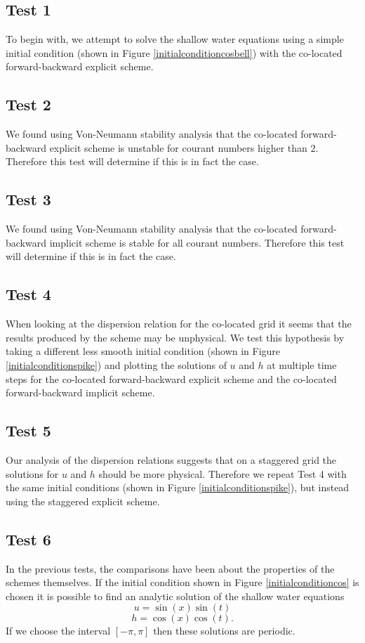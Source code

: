 \documentclass[a4paper,12pt, notitlepage]{article}
\begin{document}
\subsection{Test 1}
To begin with, we attempt to solve the shallow water equations using a simple initial condition (shown in Figure \ref{initialconditioncosbell}) with the co-located forward-backward explicit scheme.

\subsection{Test 2}
We found using Von-Neumann stability analysis that the co-located forward-backward explicit scheme is unstable for courant numbers higher than 2. Therefore this test will determine if this is in fact the case.

\subsection{Test 3}
We found using Von-Neumann stability analysis that the co-located forward-backward implicit scheme is stable for all courant numbers. Therefore this test will determine if this is in fact the case.

\subsection{Test 4}
When looking at the dispersion relation for the co-located grid it seems that the results produced by the scheme may be unphysical. We test this hypothesis by taking a different less smooth initial condition (shown in Figure \ref{initialconditionspike}) and plotting the solutions of $u$ and $h$ at multiple time steps for the co-located forward-backward explicit scheme and the co-located forward-backward implicit scheme.

\subsection{Test 5}
Our analysis of the dispersion relations suggests that on a staggered grid the solutions for $u$ and $h$ should be more physical. Therefore we repeat Test 4 with the same initial conditions (shown in Figure \ref{initialconditionspike}), but instead using the staggered explicit scheme.

\subsection{Test 6}
In the previous tests, the comparisons have been about the properties of the schemes themselves. If the initial condition shown in Figure \ref{initialconditioncos} is chosen it is possible to find an analytic solution of the shallow water equations
\begin{equation}\label{uanalytic}
u = \sin(x)\sin(t)
\end{equation}
\begin{equation}\label{hanalytic}
h = \cos(x)\cos(t).
\end{equation}
If we choose the interval $[-\pi, \pi]$ then these solutions are periodic.
\end{document}
